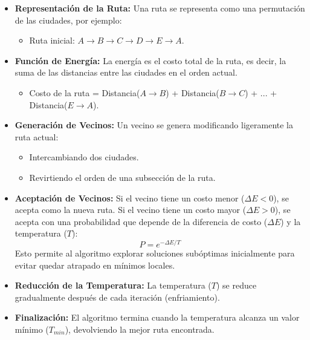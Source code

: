 \documentclass{article}
\begin{document}
\begin{itemize}
    \item \textbf{Representación de la Ruta:} Una ruta se representa como una permutación de las ciudades, por ejemplo:
    \begin{itemize}
        \item Ruta inicial: \(A \rightarrow B \rightarrow C \rightarrow D \rightarrow E \rightarrow A\).
    \end{itemize}
    \item \textbf{Función de Energía:} La energía es el costo total de la ruta, es decir, la suma de las distancias entre las ciudades en el orden actual.
    \begin{itemize}
        \item Costo de la ruta = Distancia(\(A \rightarrow B\)) + Distancia(\(B \rightarrow C\)) + ... + Distancia(\(E \rightarrow A\)).
    \end{itemize}
    \item \textbf{Generación de Vecinos:} Un vecino se genera modificando ligeramente la ruta actual:
    \begin{itemize}
        \item Intercambiando dos ciudades.
        \item Revirtiendo el orden de una subsección de la ruta.
    \end{itemize}
    \item \textbf{Aceptación de Vecinos:} Si el vecino tiene un costo menor (\(\Delta E < 0\)), se acepta como la nueva ruta. Si el vecino tiene un costo mayor (\(\Delta E > 0\)), se acepta con una probabilidad que depende de la diferencia de costo (\(\Delta E\)) y la temperatura (\(T\)):
    \begin{equation}
    P = e^{-\Delta E / T}
    \end{equation}
    Esto permite al algoritmo explorar soluciones subóptimas inicialmente para evitar quedar atrapado en mínimos locales.
    \item \textbf{Reducción de la Temperatura:} La temperatura (\(T\)) se reduce gradualmente después de cada iteración (enfriamiento).
    \item \textbf{Finalización:} El algoritmo termina cuando la temperatura alcanza un valor mínimo (\(T_{min}\)), devolviendo la mejor ruta encontrada.
\end{itemize}
\end{document}
